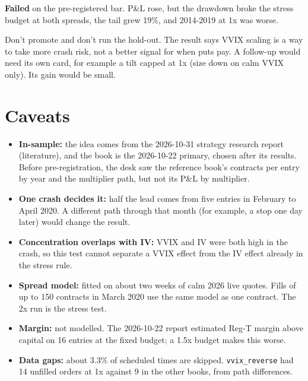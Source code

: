 \documentclass{article}
\begin{document}
\textbf{Failed} on the pre-registered bar. P\&L rose, but the drawdown broke the stress budget at both spreads, the tail grew 19\%, and 2014-2019 at 1x was worse.

Don't promote and don't run the hold-out. The result says VVIX scaling is a way to take more crash risk, not a better signal for when puts pay. A follow-up would need its own card, for example a tilt capped at 1x (size down on calm VVIX only). Its gain would be small.

\section{Caveats}

\begin{itemize}

\item \textbf{In-sample:} the idea comes from the 2026-10-31 strategy research report (literature), and the book is the 2026-10-22 primary, chosen after its results. Before pre-registration, the desk saw the reference book's contracts per entry by year and the multiplier path, but not its P\&L by multiplier.

\item \textbf{One crash decides it:} half the lead comes from five entries in February to April 2020. A different path through that month (for example, a stop one day later) would change the result.

\item \textbf{Concentration overlaps with IV:} VVIX and IV were both high in the crash, so this test cannot separate a VVIX effect from the IV effect already in the stress rule.

\item \textbf{Spread model:} fitted on about two weeks of calm 2026 live quotes. Fills of up to 150 contracts in March 2020 use the same model as one contract. The 2x run is the stress test.

\item \textbf{Margin:} not modelled. The 2026-10-22 report estimated Reg-T margin above capital on 16 entries at the fixed budget; a 1.5x budget makes this worse.

\item \textbf{Data gaps:} about 3.3\% of scheduled times are skipped. \texttt{vvix\_\allowbreak{}reverse} had 14 unfilled orders at 1x against 9 in the other books, from path differences.

\end{itemize}
\end{document}

